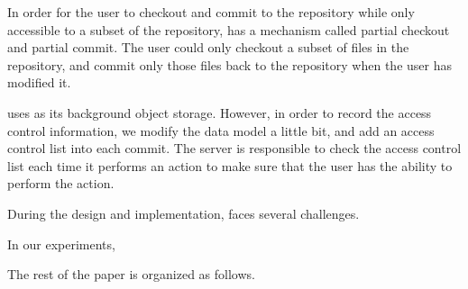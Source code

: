 In order for the user to checkout and commit to the repository while only
accessible to a subset of the repository, \sys has a mechanism called partial
checkout and partial commit. The user could only checkout a subset of files in
the repository, and commit only those files back to the repository when the user
has modified it.

\sys uses \git as its background object storage. However, in order to record the
access control information, we modify the data model a little bit, and add an
access control list into each commit. The server is responsible to check the
access control list each time it performs an action to make sure that the user
has the ability to perform the action.

During the design and implementation, \sys faces several challenges. 


In our experiments, 


The rest of the paper is organized as follows. 

